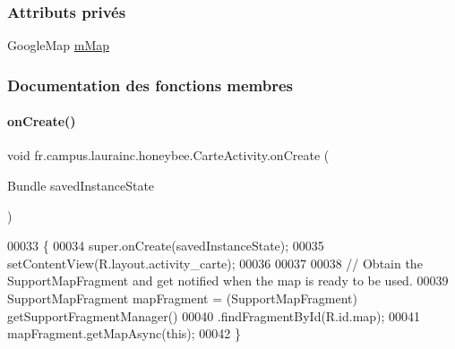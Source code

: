 \subsubsection*{Attributs privés}
\begin{DoxyCompactItemize}
\item 
Google\+Map \hyperlink{classfr_1_1campus_1_1laurainc_1_1honeybee_1_1_carte_activity_a101cebc8274b075aa3fee06ce55bf2fd}{m\+Map}
\end{DoxyCompactItemize}


\subsubsection{Documentation des fonctions membres}
\mbox{\label{classfr_1_1campus_1_1laurainc_1_1honeybee_1_1_carte_activity_a6e10bf7de1bf581b5118fa6de2ac465e}} 
\paragraph{\texorpdfstring{on\+Create()}{onCreate()}}
{\footnotesize\ttfamily void fr.\+campus.\+laurainc.\+honeybee.\+Carte\+Activity.\+on\+Create (\begin{DoxyParamCaption}\item[{Bundle}]{saved\+Instance\+State }\end{DoxyParamCaption})\hspace{0.3cm}{\ttfamily [protected]}}


\begin{DoxyCode}
00033                                                        \{
00034         super.onCreate(savedInstanceState);
00035         setContentView(R.layout.activity\_carte);
00036 
00037 
00038         \textcolor{comment}{// Obtain the SupportMapFragment and get notified when the map is ready to be used.}
00039         SupportMapFragment mapFragment = (SupportMapFragment) getSupportFragmentManager()
00040                 .findFragmentById(R.id.map);
00041         mapFragment.getMapAsync(\textcolor{keyword}{this});
00042     \}
\end{DoxyCode}
\mbox{\label{classfr_1_1campus_1_1laurainc_1_1honeybee_1_1_carte_activity_a30d970c7028be9de18778dbb19e65196}} 
